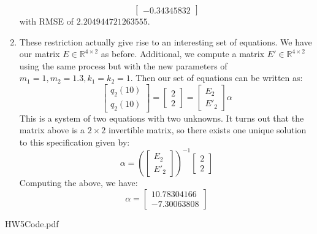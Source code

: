 \documentclass[12pt]{exam}
\begin{document}
\begin{questions}
\begin{solution}
\begin{enumerate}[label=(\alph*)]
\[\begin{bmatrix}
            -0.34345832
          \end{bmatrix}
      \]
      with RMSE of $2.204944721263555$.
      \item These restriction actually give rise to an interesting set of equations. We have our matrix $E \in \mathbb{R}^{4 \times 2}$ as before. Additional, we compute a matrix $E' \in \mathbb{R}^{4 \times 2}$ using the same process but with the new parameters of $m_1 = 1, m_2 = 1.3, k_1 = k_2 = 1$. Then our set of equations can be written as:
      \[
        \begin{bmatrix}
          q_2(10)\\
          q_2(10)
        \end{bmatrix} =
        \begin{bmatrix}
          2\\
          2
        \end{bmatrix} = 
        \begin{bmatrix}
          E_2 \\
          E'_2
        \end{bmatrix}
        \alpha
      \]
      This is a system of two equations with two unknowns. It turns out that the matrix above is a $2 \times 2$ invertible matrix, so there exists one unique solution to this specification given by:
      \[
        \alpha = \left(\begin{bmatrix}
          E_2 \\
          E'_2
        \end{bmatrix} \right)^{-1} \begin{bmatrix}
          2\\
          2
        \end{bmatrix}
      \]
      Computing the above, we have:
      \[
        \alpha =
          \begin{bmatrix}
            10.78304166 \\
            -7.30063808
          \end{bmatrix}
      \]
    \end{enumerate}
  \end{solution}
\end{questions}



{HW5Code.pdf}
\end{document}
